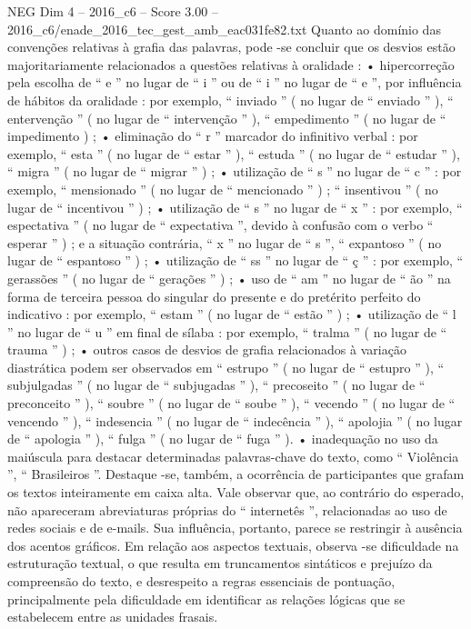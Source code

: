 \begin{textsample}{NEG Dim 4 – 2016\_c6 – Score 3.00 – 2016\_c6/enade\_2016\_tec\_gest\_amb\_eac031fe82.txt}
Quanto ao domínio das convenções relativas à grafia das palavras, pode -se concluir que os desvios estão majoritariamente relacionados a questões relativas à oralidade : • hipercorreção pela escolha de “ e ” no lugar de “ i ” ou de “ i ” no lugar de “ e ”, por influência de hábitos da oralidade : por exemplo, “ inviado ” ( no lugar de “ enviado ” ), “ entervenção ” ( no lugar de “ intervenção ” ), “ empedimento ” ( no lugar de “ impedimento ) ; • eliminação do “ r ” marcador do infinitivo verbal : por exemplo, “ esta ” ( no lugar de “ estar ” ), “ estuda ” ( no lugar de “ estudar ” ), “ migra ” ( no lugar de “ migrar ” ) ; • utilização de “ s ” no lugar de “ c ” : por exemplo, “ mensionado ” ( no lugar de “ mencionado ” ) ; “ insentivou ” ( no lugar de “ incentivou ” ) ; • utilização de “ s ” no lugar de “ x ” : por exemplo, “ espectativa ” ( no lugar de “ expectativa ”, devido à confusão com o verbo “ esperar ” ) ; e a situação contrária, “ x ” no lugar de “ s ”, “ expantoso ” ( no lugar de “ espantoso ” ) ; • utilização de “ ss ” no lugar de “ ç ” : por exemplo, “ gerassões ” ( no lugar de “ gerações ” ) ; • uso de “ am ” no lugar de “ ão ” na forma de terceira pessoa do singular do presente e do pretérito perfeito do indicativo : por exemplo, “ estam ” ( no lugar de “ estão ” ) ; • utilização de “ l ” no lugar de “ u ” em final de sílaba : por exemplo, “ tralma ” ( no lugar de “ trauma ” ) ; • outros casos de desvios de grafia relacionados à variação diastrática podem ser observados em “ estrupo ” ( no lugar de “ estupro ” ), “ subjulgadas ” ( no lugar de “ subjugadas ” ), “ precoseito ” ( no lugar de “ preconceito ” ), “ soubre ” ( no lugar de “ soube ” ), “ vecendo ” ( no lugar de “ vencendo ” ), “ indesencia ” ( no lugar de “ indecência ” ), “ apolojia ” ( no lugar de “ apologia ” ), “ fulga ” ( no lugar de “ fuga ” ). • inadequação no uso da maiúscula para destacar determinadas palavras-chave do texto, como “ Violência ”, “ Brasileiros ”.
Destaque -se, também, a ocorrência de participantes que grafam os textos inteiramente em caixa alta.
Vale observar que, ao contrário do esperado, não apareceram abreviaturas próprias do “ internetês ”, relacionadas ao uso de redes sociais e de e-mails.
Sua influência, portanto, parece se restringir à ausência dos acentos gráficos.
Em relação aos aspectos textuais, observa -se dificuldade na estruturação textual, o que resulta em truncamentos sintáticos e prejuízo da compreensão do texto, e desrespeito a regras essenciais de pontuação, principalmente pela dificuldade em identificar as relações lógicas que se estabelecem entre as unidades frasais.

\end{textsample}
